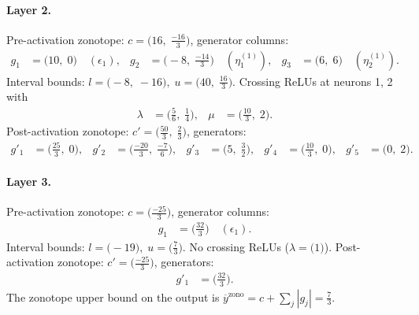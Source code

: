 \documentclass[11pt]{article}
\begin{document}
\paragraph{Layer 2.}
Pre-activation zonotope: $c = \bigl(16,\; \frac{-16}{3}\bigr)$, generator columns:
\begin{align*}
g_{1} &= \bigl(10,\; 0\bigr) \quad (\epsilon_{1}), &
g_{2} &= \bigl(-8,\; \frac{-14}{3}\bigr) \quad (\eta^{(1)}_{1}), &
g_{3} &= \bigl(6,\; 6\bigr) \quad (\eta^{(1)}_{2}).
\end{align*}
Interval bounds: $l = \bigl(-8,\; -16\bigr), \; u = \bigl(40,\; \frac{16}{3}\bigr)$. 
Crossing ReLUs at neurons 1, 2 with
\begin{align*}
\lambda &= \bigl(\frac{5}{6},\; \frac{1}{4}\bigr), & \mu &= \bigl(\frac{10}{3},\; 2\bigr).
\end{align*}
Post-activation zonotope: $c' = \bigl(\frac{50}{3},\; \frac{2}{3}\bigr)$, generators:
\begin{align*}
g'_{1} &= \bigl(\frac{25}{3},\; 0\bigr), &
g'_{2} &= \bigl(\frac{-20}{3},\; \frac{-7}{6}\bigr), &
g'_{3} &= \bigl(5,\; \frac{3}{2}\bigr), &
g'_{4} &= \bigl(\frac{10}{3},\; 0\bigr), &
g'_{5} &= \bigl(0,\; 2\bigr).
\end{align*}
\paragraph{Layer 3.}
Pre-activation zonotope: $c = \bigl(\frac{-25}{3}\bigr)$, generator columns:
\begin{align*}
g_{1} &= \bigl(\frac{32}{3}\bigr) \quad (\epsilon_{1}).
\end{align*}
Interval bounds: $l = \bigl(-19\bigr), \; u = \bigl(\frac{7}{3}\bigr)$. 
No crossing ReLUs ($\lambda = \bigl(1\bigr)$).
Post-activation zonotope: $c' = \bigl(\frac{-25}{3}\bigr)$, generators:
\begin{align*}
g'_{1} &= \bigl(\frac{32}{3}\bigr).
\end{align*}
The zonotope upper bound on the output is $\overline{y}^{\text{zono}} = c + \sum_j |g_j| = \frac{7}{3}$.
\end{document}
